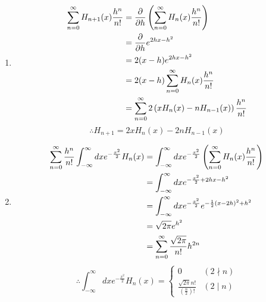 \item

\begin{enumerate}[wide, labelindent = 0pt, label = (\alph*)]
\item
\begin{align*}
    \sum_{n = 0}^\infty H_{n + 1}(x) \frac{h^n}{n!}
    &= \frac{\partial}{\partial{}h} \left(
        \sum_{n = 0}^\infty H_n(x) \frac{h^n}{n!}
    \right) \\
    &= \frac{\partial}{\partial{}h} e^{2hx - h^2} \\
    &= 2 (x - h) e^{2hx - h^2} \\
    &= 2 (x - h) \sum_{n = 0}^\infty H_n(x) \frac{h^n}{n!} \\
    &= \sum_{n = 0}^\infty 2\left(
        xH_n(x) - nH_{n - 1}(x)
    \right) \frac{h^n}{n!}
\end{align*}
\[
    \therefore H_{n + 1} = 2xH_n(x) - 2nH_{n - 1}(x)
\]

\item
\begin{align*}
    \sum_{n = 0}^\infty \frac{h^n}{n!}
    \int_{-\infty}^\infty dx e^{-\frac{x^2}{2}} H_n(x)
    &= \int_{-\infty}^\infty dx e^{-\frac{x^2}{2}} \left(
        \sum_{n = 0}^\infty H_n(x) \frac{h^n}{n!}
    \right) \\
    &= \int_{-\infty}^\infty dx e^{-\frac{x^2}{2} + 2hx - h^2} \\
    &= \int_{-\infty}^\infty dx e^{-\frac{x^2}{2}} e^{
        -\frac{1}{2} {(x - 2h)}^2 + h^2
    } \\
    &= \sqrt{2\pi} e^{h^2} \\
    &= \sum_{n = 0}^\infty \frac{\sqrt{2\pi}}{n!} h^{2n}
\end{align*}
\[
    \therefore \int_{-\infty}^\infty dx e^{-\frac{x^2}{2}} H_n(x) =
    \begin{cases}
        0 & (2 \nmid n) \\
        \frac{\sqrt{2\pi} n!}{\left( \frac{n}{2} \right)!} & (2 \mid n)
    \end{cases}
\]
\end{enumerate}